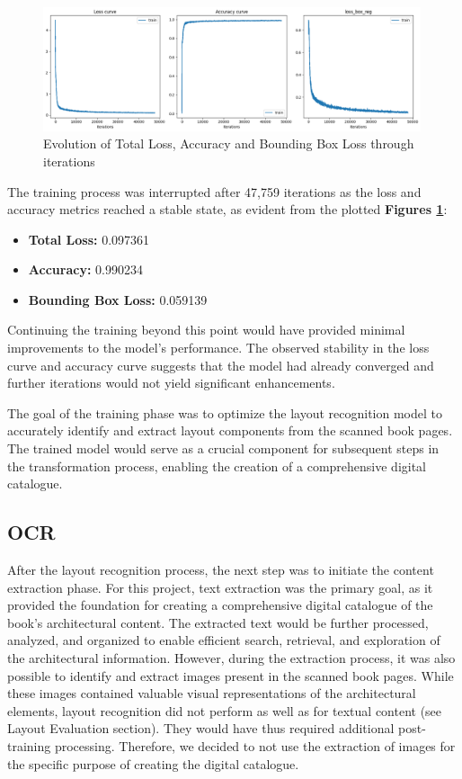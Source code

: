 \begin{figure}[H]
    \centering
    \includegraphics[width=0.99\textwidth]{Images/training_curves.png}
    \caption{Evolution of Total Loss, Accuracy and Bounding Box Loss through iterations}
    \label{fig:training}
\end{figure}

The training process was interrupted after 47,759 iterations as the loss and accuracy metrics reached a stable state, as evident from the plotted \textbf{Figures \ref{fig:training}}:
\begin{itemize}
    \item \textbf{Total Loss:} 0.097361
    \item \textbf{Accuracy:} 0.990234
    \item \textbf{Bounding Box Loss:} 0.059139
\end{itemize}

Continuing the training beyond this point would have provided minimal improvements to the model's performance. The observed stability in the loss curve and accuracy curve suggests that the model had already converged and further iterations would not yield significant enhancements. 

The goal of the training phase was to optimize the layout recognition model to accurately identify and extract layout components from the scanned book pages. The trained model would serve as a crucial component for subsequent steps in the transformation process, enabling the creation of a comprehensive digital catalogue.

\subsection{OCR}
After the layout recognition process, the next step was to initiate
the content extraction phase.
For this project, text extraction was the primary goal, as it provided the foundation for creating a comprehensive digital catalogue of the book's architectural content. The extracted text would be further processed, analyzed, and organized to enable efficient search, retrieval, and exploration of the architectural information.
However, during the extraction process, it was also possible to identify and extract images present in the scanned book pages. 
While these images contained valuable visual representations of the architectural elements, layout recognition did not perform as well as for textual content (see Layout Evaluation section).
They would have thus required additional post-training processing. Therefore, we decided to not use the extraction of images for the specific purpose of creating the digital catalogue. 

